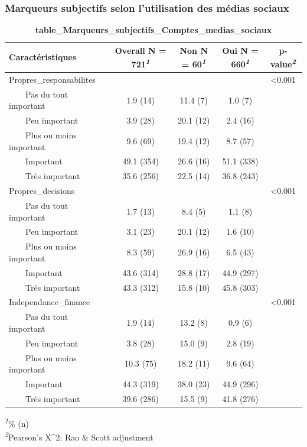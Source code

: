 \documentclass[
]{article}
\begin{document}
\hypertarget{marqueurs-subjectifs-selon-lutilisation-des-muxe9dias-sociaux}{%
\subsubsection{Marqueurs subjectifs selon l'utilisation des médias
sociaux}\label{marqueurs-subjectifs-selon-lutilisation-des-muxe9dias-sociaux}}

\begin{table}[!t]
\caption{\label{tab:unnamed-chunk-83}\textbf{table\_Marqueurs\_subjectifs\_Comptes\_medias\_sociaux}} 
\fontsize{12.0pt}{14.4pt}\selectfont
\begin{tabular*}{\linewidth}{@{\extracolsep{\fill}}lcccc}
\toprule
\textbf{Caractéristiques} & \textbf{Overall}  N = 721\textsuperscript{\textit{1}} & \textbf{Non}  N = 60\textsuperscript{\textit{1}} & \textbf{Oui}  N = 660\textsuperscript{\textit{1}} & \textbf{p-value}\textsuperscript{\textit{2}} \\ 
\midrule\addlinespace[2.5pt]
Propres\_responsabilites &  &  &  & <0.001 \\ 
    Pas du tout important & 1.9 (14) & 11.4 (7) & 1.0 (7) &  \\ 
    Peu important & 3.9 (28) & 20.1 (12) & 2.4 (16) &  \\ 
    Plus ou moins important & 9.6 (69) & 19.4 (12) & 8.7 (57) &  \\ 
    Important & 49.1 (354) & 26.6 (16) & 51.1 (338) &  \\ 
    Très important & 35.6 (256) & 22.5 (14) & 36.8 (243) &  \\ 
Propres\_decisions &  &  &  & <0.001 \\ 
    Pas du tout important & 1.7 (13) & 8.4 (5) & 1.1 (8) &  \\ 
    Peu important & 3.1 (23) & 20.1 (12) & 1.6 (10) &  \\ 
    Plus ou moins important & 8.3 (59) & 26.9 (16) & 6.5 (43) &  \\ 
    Important & 43.6 (314) & 28.8 (17) & 44.9 (297) &  \\ 
    Très important & 43.3 (312) & 15.8 (10) & 45.8 (303) &  \\ 
Independance\_finance &  &  &  & <0.001 \\ 
    Pas du tout important & 1.9 (14) & 13.2 (8) & 0.9 (6) &  \\ 
    Peu important & 3.8 (28) & 15.0 (9) & 2.8 (19) &  \\ 
    Plus ou moins important & 10.3 (75) & 18.2 (11) & 9.6 (64) &  \\ 
    Important & 44.3 (319) & 38.0 (23) & 44.9 (296) &  \\ 
    Très important & 39.6 (286) & 15.5 (9) & 41.8 (276) &  \\ 
\bottomrule
\end{tabular*}
\begin{minipage}{\linewidth}
\textsuperscript{\textit{1}}\% (n)\\
\textsuperscript{\textit{2}}Pearson's X\^{}2: Rao \& Scott adjustment\\
\end{minipage}
\end{table}
\end{document}
